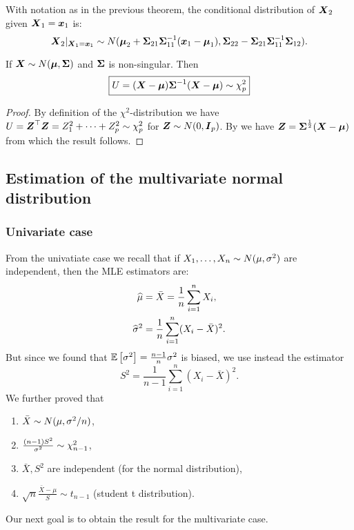 \begin{theorem}
    With notation as in the previous theorem, the conditional distribution of $\boldsymbol{X}_2$ given $\boldsymbol{X}_1=\boldsymbol{x}_1$ is:
    $$
        \boldsymbol{X}_2 |_{\boldsymbol{X}_1 = \boldsymbol{x}_1} \sim N(\boldsymbol{\mu}_2 + \boldsymbol{\Sigma}_{21}\boldsymbol{\Sigma}_{11}^{-1}(\boldsymbol{x}_1-\boldsymbol{\mu}_1), \boldsymbol{\Sigma}_{22}-\boldsymbol{\Sigma}_{21}\boldsymbol{\Sigma}_{11}^{-1}\boldsymbol{\Sigma}_{12}).
    $$
\end{theorem}

\begin{theorem}
    If $\boldsymbol{X}\sim N(\boldsymbol{\mu}, \boldsymbol{\Sigma})$ and $\boldsymbol{\Sigma}$ is non-singular. Then 
    $$
        \boxed{U = (\boldsymbol{X}-\boldsymbol{\mu})\boldsymbol{\Sigma}^{-1}(\boldsymbol{X}-\boldsymbol{\mu}) \sim \chi^2_p}
    $$
\end{theorem}
\begin{proof}
    By definition of the $\chi^2$-distribution we have $U=\boldsymbol{Z}^\top\boldsymbol{Z}=Z_1^2+\dots+Z_p^2 \sim \chi_p^2$ for $\boldsymbol{Z}\sim N(0, \boldsymbol{I}_p)$. By  we have $\boldsymbol{Z}=\boldsymbol{\Sigma}^{\frac{1}{2}}(\boldsymbol{X}-\boldsymbol{\mu})$ from which the result follows. 
\end{proof}


\subsection{Estimation of the multivariate normal distribution}
\subsubsection{Univariate case}
From the univatiate case we recall that if $X_1,\dots,X_n \sim N(\mu, {\sigma^2})$ are independent, then the MLE estimators are:
\begin{align*}
    \widehat{\mu} &= \bar{X} = \frac{1}{n} \sum_{i=1}^n X_i, \\
    \widehat{\sigma}^2 &= \frac{1}{n} \sum_{i=1}^n (X_i-\bar{X})^2.
\end{align*}
But since we found that $\mathbb{E}\left[\sigma^2\right]=\frac{n-1}{n} \sigma^2$ is biased, we use instead the estimator
$$
    S^2 = \frac{1}{n-1} \sum_{i=1}^n (X_i-\bar{X})^2.
$$
We further proved that
\begin{enumerate}
    \item $\bar{X} \sim N(\mu, \sigma^2/n)$,
    \item $\frac{(n-1)S^2}{\sigma^2} \sim \chi^2_{n-1}$,
    \item $\bar{X}, S^2$ are independent (for the normal distribution),
    \item $\sqrt{n} \frac{\bar{X}-\mu}{S} \sim t_{n-1}$ (student t distribution).
\end{enumerate}
Our next goal is to obtain the result for the multivariate case. 

